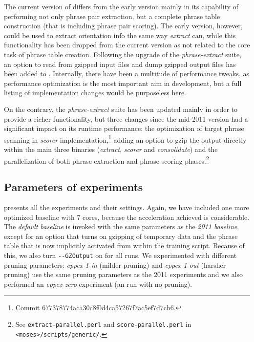 The current version of \eppex{} differs from the early version mainly in its
capability of performing not only phrase pair extraction, but a complete
phrase table construction (that is including phrase pair scoring).
The early version, however, could be used to extract orientation info
the same way \emph{extract} can, while this functionality has been dropped
from the current version as not related to the core task of phrase table creation.
Following the upgrade of the \emph{phrase-extract} suite, an option to read from
gzipped input files and dump gzipped output files has been added to \eppex{}.
Internally, there have been a multitude of performance tweaks,
as performance optimization is the most important aim in \eppex{} development,
but a full listing of implementation changes would be purposeless here.

On the contrary, the \emph{phrase-extract} suite has been updated mainly in order to
provide a richer functionality, but three changes since the mid-2011 version
had a significant impact on its runtime performance: the optimization of target phrase
scanning in \emph{scorer} implementation,\footnote{Commit 677378774aca30c8f0d4ca57267f7ac5ef7d7cb6.}
adding an option to gzip the output directly within the main three binaries
(\emph{extract}, \emph{scorer} and \emph{consolidate})
and the parallelization of both phrase extraction and phrase scoring
phases.\footnote{See \texttt{extract-parallel.perl} and \texttt{score-parallel.perl}
in \texttt{<moses>/scripts/generic/}.}

\subsection{Parameters of experiments}

 presents all the experiments and their settings.
Again, we have included one more optimized baseline with 7 cores, because
the acceleration achieved is considerable.
The \emph{default baseline} is invoked with the same parameters as the \emph{2011
baseline}, except for an option that turns on gzipping of temporary data and
the phrase table that is now implicitly activated from within the training script.
Because of this, we also turn \verb|--GZOutput| on for all \eppex{} runs.
We experimented with different pruning parameters: \emph{eppex-1-in} (milder
pruning) and \emph{eppex-1-out} (harsher pruning) use the same pruning
parameters as the 2011 experiments and we also performed an \emph{eppex zero}
experiment (an \eppex{} run with no pruning).

